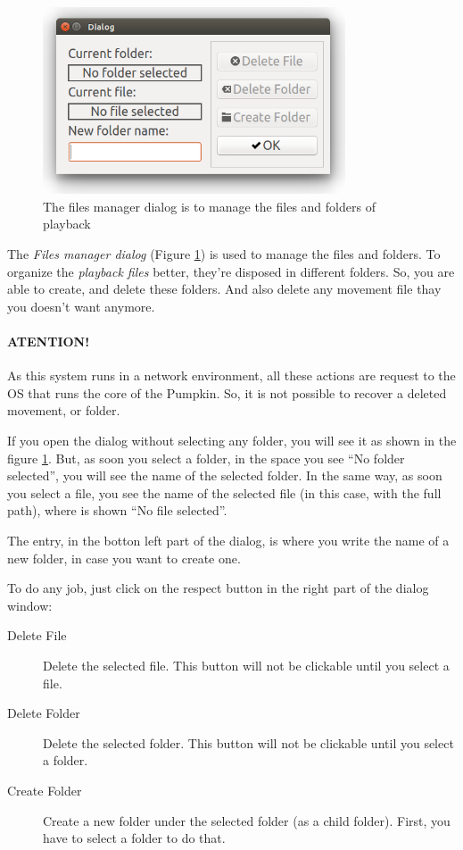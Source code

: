 \documentclass[oneside,a4paper,titlepage]{article}
\begin{document}
\begin{figure}[h]
	\centering
	\includegraphics[width=0.8\textwidth]{manage_files}
	\caption[Files Manager]{The files manager dialog is to manage the files and folders of playback}
	\label{fig:manage_files}
\end{figure}

The \emph{Files manager dialog} (Figure \ref{fig:manage_files}) is used to manage the files and folders. To organize the \emph{playback files} better, they're disposed in different folders. So, you are able to create, and delete these folders. And also delete any movement file thay you doesn't want anymore.

{\color{red}
\paragraph{ATENTION!} As this system runs in a network environment, all these actions are request to the OS that runs the core of the Pumpkin. So, it is not possible to recover a deleted movement, or folder.
}

If you open the dialog without selecting any folder, you will see it as shown in the figure \ref{fig:manage_files}. But, as soon you select a folder, in the space you see ``No folder selected'', you will see the name of the selected folder. In the same way, as soon you select a file, you see the name of the selected file (in this case, with the full path), where is shown ``No file selected''.

The entry, in the botton left part of the dialog, is where you write the name of a new folder, in case you want to create one.

To do any job, just click on the respect button in the right part of the dialog window:

\begin{description}
	\item[Delete File] Delete the selected file. This button will not be clickable until you select a file.
	
	\item[Delete Folder] Delete the selected folder. This button will not be clickable until you select a folder.
	
	\item[Create Folder] Create a new folder under the selected folder (as a child folder). First, you have to select a folder to do that.
\end{description}
\end{document}
